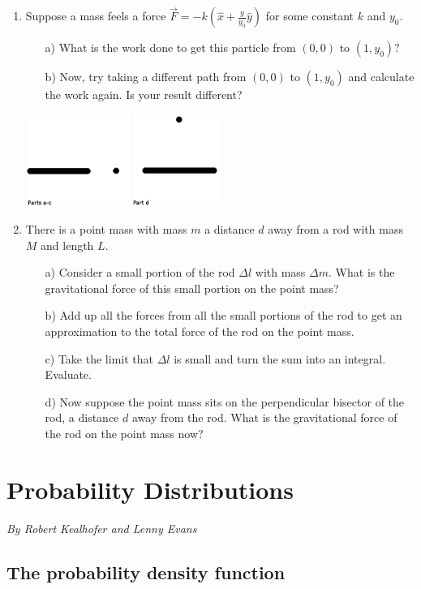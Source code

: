 \documentclass[12pt]{book}
\begin{document}
\begin{enumerate}
 \item Suppose a mass feels a force $\vec{F} = -k(\hat{x}+\frac{y}{y_0}\hat{y})$ for some constant $k$ and $y_0.$
 \begin{enumerate}
 \item[a)] What is the work done to get this particle from $(0,0)$ to $(1,y_0)?$ 
 \item[b)] Now, try taking a different path from $(0,0)$ to $(1,y_0)$ and calculate the work again. Is your result different?
\end{enumerate}
\begin{center}
 \includegraphics[width=0.5\textwidth]{Rod.png}
\end{center}
\item There is a point mass with mass $m$ a distance $d$ away from a rod with mass $M$ and length $L.$
\begin{enumerate}
 \item[a)] Consider a small portion of the rod $\Delta l$ with mass $\Delta m.$ What is the gravitational force of this small portion on the point mass?
 \item[b)] Add up all the forces from all the small portions of the rod to get an approximation to the total force of the rod on the point mass.
 \item[c)] Take the limit that $\Delta l$ is small and turn the sum into an integral. Evaluate.
 \item[d)] Now suppose the point mass sits on the perpendicular bisector of the rod, a distance $d$ away from the rod. What is the gravitational force of the rod on the point mass now?
\end{enumerate}
 \end{enumerate}

 
 \pagebreak

\section{Probability Distributions}

{\it By Robert Kealhofer and Lenny Evans}

\subsection{The probability density function}
\end{document}
